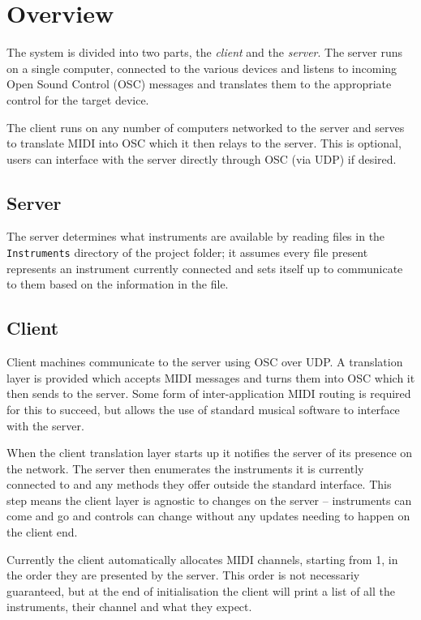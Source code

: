 \documentclass[11pt]{article}
\begin{document}
\section{Overview}
The system is divided into two parts, the {\em client} and the {\em server}. The server runs on a single computer, connected to the various devices and listens to incoming Open Sound 
Control (OSC) messages and translates them to the appropriate control for the target device. 

The client runs on any number of computers networked to the server and serves to translate MIDI into OSC which it then relays to the server. This is optional, users
can interface with the server directly through OSC (via UDP) if desired.

\subsection{Server}
The server determines what instruments are available by reading files in the \texttt{Instruments} directory of the project folder; it assumes every file present represents an instrument
currently connected and sets itself up to communicate to them based on the information in the file.

\subsection{Client}
Client machines communicate to the server using OSC over UDP. A translation layer is provided which accepts MIDI messages and turns them into OSC which it then sends to the 
server. Some form of inter-application MIDI routing is required for this to succeed, but allows the use of standard musical software to interface with the server. 

When the client translation layer starts up it notifies the server of its presence on the network. The server then enumerates the instruments it is currently connected to and any methods
they offer outside the standard interface. This step means the client layer is agnostic to changes on the server -- instruments can come and go and controls can change without any
updates needing to happen on the client end.

Currently the client automatically allocates MIDI channels, starting from 1, in the order they are presented by the server.
This order is not necessariy guaranteed, but at the end of initialisation the client will print a list of all the instruments,
their channel and what they expect.
\end{document}
